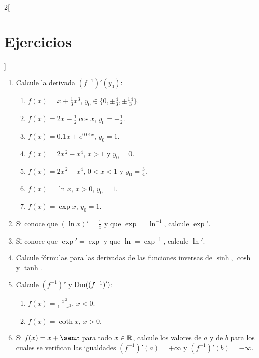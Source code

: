 \begin{multicols}{2}[\section{Ejercicios}]
\begingroup\small
\begin{enumerate}[leftmargin=*]
\item Calcule la derivada $(f^{-1})'(y_0)$:
    \begin{enumerate}[leftmargin=*]
    \item $\displaystyle f(x) = x + \frac{1}{3}x^3$, $y_0
        \in\{0,\pm\frac{4}{3},\pm\frac{14}{3}\}$.
    \item $\displaystyle f(x) = 2x - \frac{1}{2}\cos x$, $y_0 = -\frac{1}{2}$.
    \item $\displaystyle f(x) = 0.1x + e^{0.01x}$, $y_0 = 1$.
    \item $\displaystyle f(x) = 2x^2 - x^4$, $x > 1$ y $y_0 = 0$.
    \item $\displaystyle f(x) = 2x^2 - x^4$, $0 < x < 1$ y $y_0 = \frac{3}{4}$.
    \item $\displaystyle f(x) = \ln x$, $x > 0$, $y_0=1$.
    \item $\displaystyle f(x) = \exp x$, $y_0=1$.
    \end{enumerate}

\item Si conoce que $(\ln x)' = \frac{1}{x}$ y que $\exp = \ln^{-1}$, calcule $\exp'$.

\item Si conoce que $\exp' = \exp$ y que $\ln = \exp^{-1}$, calcule $\ln'$.

\item Calcule fórmulas para las derivadas de las funciones inversas de $\sinh$, $\cosh$ y
    $\tanh$.
\item Calcule $(f^{-1})'$ y $\operatorname{Dm}((f^{-1})')$:
    \begin{enumerate}[leftmargin=*]
    \item $\displaystyle f(x) = \frac{x^2}{1 + x^2}$, $x < 0$.
    \item $\displaystyle f(x) = \coth x$, $x > 0$.
    \end{enumerate}

\item Si $f(x) = x + \sen x$ para todo $x\in\mathbb{R}$, calcule los valores de $a$ y de $b$ para los
    cuales se verifican las igualdades $(f^{-1})'(a) = +\infty$ y $(f^{-1})'(b) = -\infty$.
\end{enumerate}
\endgroup
\end{multicols}

